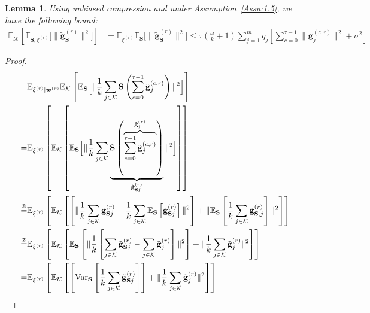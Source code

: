 \documentclass[twoside]{article}
\newtheorem{lemma}{Lemma}
\begin{document}
\begin{lemma}\label{lemma:tasbih1-iid}
Using unbiased compression and under Assumption~\ref{Assu:1.5}, we have the following bound: 
\begin{align}
\mathbb{E}_{\mathcal{K}}\left[\mathbb{E}_{{\mathbf{S},\xi^{(r)}}}\Big[\|\tilde{\mathbf{g}}_{\mathbf{S}}^{(r)}\|^2\Big]\right]&=\mathbb{E}_{{\xi}^{(r)}}\mathbb{E}_{\mathbf{S}}\Big[\|\tilde{\mathbf{g}}_\mathbf{S}^{(r)}\|^2\Big]\leq \tau(\frac{\omega}{k}+1)\sum_{j=1}^mq_j\left[\sum_{c=0}^{\tau-1}\|\mathbf{g}_j^{(c,r)}\|^2+\sigma^2\right] \label{eq:lemma1}
\end{align}
\end{lemma}

\begin{proof}
\begin{align}
&\mathbb{E}_{{\xi^{(r)}|\boldsymbol{w}^{(r)}}}\mathbb{E}_{\mathcal{K}}\left[\mathbb{E}_{{\mathbf{S}}}\Big[\|\frac{1}{k}\sum_{j\in \mathcal{K}} \mathbf{S}\left(\sum_{c=0}^{\tau-1}\tilde{\mathbf{g}}^{(c,r)}_j\right)\|^2\Big]\right]\nonumber\\
=&\mathbb{E}_{{\xi}^{(r)}}\left[\mathbb{E}_{\mathcal{K}}\left[\mathbb{E}_{\mathbf{S}}\Big[\|\frac{1}{k}\sum_{j\in\mathcal{K}}\underbrace{\mathbf{S}\left(\overbrace{\sum_{c=0}^{\tau-1}\tilde{\mathbf{g}}^{(c,r)}_j}^{\tilde{\mathbf{g}}_j^{(r)}}\right)}_{\tilde{\mathbf{g}}_{\mathbf{S}j}^{(r)}}\|^2\Big]\right]\right]\nonumber\\
\stackrel{\text{\ding{192}}}{=}&\mathbb{E}_{{\xi}^{(r)}}\left[\mathbb{E}_{\mathcal{K}}\left[\left[\|\frac{1}{k}\sum_{j\in\mathcal{K}}\tilde{\mathbf{g}}_{\mathbf{S}j}^{(r)}-\frac{1}{k}\sum_{j\in\mathcal{K}}\mathbb{E}_{\mathbf{S}}\left[\tilde{\mathbf{g}}_{\mathbf{S}j}^{(r)}\right]\|^2\right]+\|\mathbb{E}_{\mathbf{S}}\left[\frac{1}{k}\sum_{j\in\mathcal{K}}\tilde{\mathbf{g}}_{\mathbf{S},j}^{(r)}\right]\|^2\right]\right]\nonumber\\
\stackrel{\text{\ding{193}}}{=}&\mathbb{E}_{{\xi}^{(r)}}\left[\mathbb{E}_{\mathcal{K}}\left[\mathbb{E}_{\mathbf{S}}\left[\|\frac{1}{k}\left[\sum_{j\in\mathcal{K}}\tilde{\mathbf{g}}_{\mathbf{S}j}^{(r)}-\sum_{j\in\mathcal{K}}\tilde{\mathbf{g}}_{j}^{(r)}\right]\|^2\right]+\|\frac{1}{k}\sum_{j\in\mathcal{K}}\tilde{\mathbf{g}}_{j}^{(r)}\|^2\right]\right]\nonumber\\
\stackrel{}{=}& \mathbb{E}_{{\xi}^{(r)}}\left[\mathbb{E}_{\mathcal{K}}\left[\left[\text{Var}_{\mathbf{S}}\left[\frac{1}{k}\sum_{j\in\mathcal{K}}\tilde{\mathbf{g}}_{\mathbf{S}j}^{(r)}\right]\right]+\|\frac{1}{k}\sum_{j\in\mathcal{K}}\tilde{\mathbf{g}}_{j}^{(r)}\|^2\right]\right]\nonumber\\

\end{align}
\end{proof}
\end{document}
